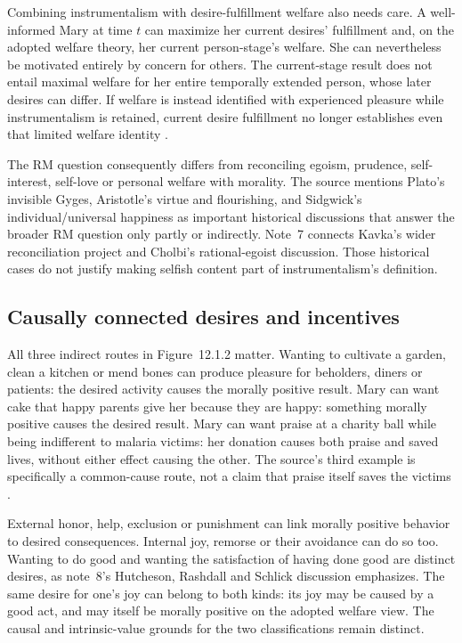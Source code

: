 Combining instrumentalism with desire-fulfillment welfare also needs
care. A well-informed Mary at time \(t\) can maximize her current
desires' fulfillment and, on the adopted welfare theory, her current
person-stage's welfare. She can nevertheless be motivated entirely
by concern for others. The current-stage result does not entail
maximal welfare for her entire temporally extended person, whose
later desires can differ. If welfare is instead identified with
experienced pleasure while instrumentalism is retained, current
desire fulfillment no longer establishes even that limited welfare
identity \parencite[pp.~683--684]{FehigeWessels2021Morality}.

The RM question consequently differs from reconciling egoism,
prudence, self-interest, self-love or personal welfare with morality.
The source mentions Plato's invisible Gyges, Aristotle's virtue and
flourishing, and Sidgwick's individual/universal happiness as important
historical discussions that answer the broader RM question only
partly or indirectly. Note~7 connects Kavka's wider reconciliation
project and Cholbi's rational-egoist discussion. Those historical
cases do not justify making selfish content part of instrumentalism's
definition.

\subsection{Causally connected desires and incentives}

All three indirect routes in Figure~12.1.2 matter. Wanting to
cultivate a garden, clean a kitchen or mend bones can produce pleasure
for beholders, diners or patients: the desired activity causes the
morally positive result. Mary can want cake that happy parents give
her because they are happy: something morally positive causes the
desired result. Mary can want praise at a charity ball while being
indifferent to malaria victims: her donation causes both praise
and saved lives, without either effect causing the other.
The source's third example is specifically a common-cause route,
not a claim that praise itself saves the victims
\parencite[p.~684]{FehigeWessels2021Morality}.

External honor, help, exclusion or punishment can link morally
positive behavior to desired consequences. Internal joy, remorse
or their avoidance can do so too. Wanting to do good and wanting
the satisfaction of having done good are distinct desires, as
note~8's Hutcheson, Rashdall and Schlick discussion emphasizes.
The same desire for one's joy can belong to both kinds: its joy
may be caused by a good act, and may itself be morally positive
on the adopted welfare view. The causal and intrinsic-value grounds
for the two classifications remain distinct.

